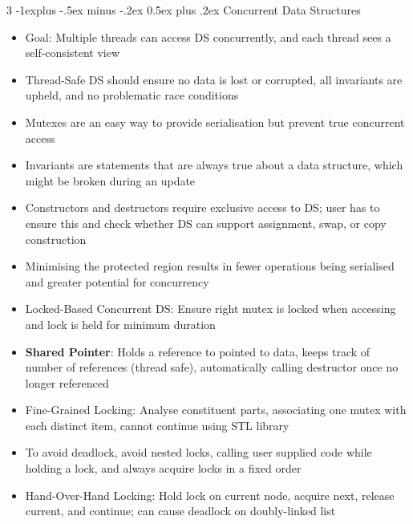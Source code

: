 \documentclass[10pt, landscape]{article}
\makeatletter
\renewcommand{\section}{\@startsection{section}{1}{0mm}%
                                {-1ex plus -.5ex minus -.2ex}%
                                {0.5ex plus .2ex}%
                                {\normalfont\large\bfseries}}
\renewcommand{\section}{\@startsection{section}{2}{0mm}%
                                {-1explus -.5ex minus -.2ex}%
                                {0.5ex plus .2ex}%
                                {\normalfont\normalsize\bfseries}}
\makeatother
\begin{document}
\begin{multicols*}{3}
\section{Concurrent Data Structures}
\begin{itemize}
    \item Goal: Multiple threads can access DS concurrently, and each thread sees a self-consistent view
    \item Thread-Safe DS should ensure no data is lost or corrupted, all invariants are upheld, and no problematic race conditions
    \item Mutexes are an easy way to provide serialisation but prevent true concurrent access
    \item Invariants are statements that are always true about a data structure, which might be broken during an update
    \item Constructors and destructors require exclusive access to DS; user has to ensure this and check whether DS can support assignment, swap, or copy construction
    \item Minimising the protected region results in fewer operations being serialised and greater potential for concurrency
    \item Locked-Based Concurrent DS: Ensure right mutex is locked when accessing and lock is held for minimum duration
    \item \textbf{Shared Pointer}: Holds a reference to pointed to data, keeps track of number of references (thread safe), automatically calling destructor once no longer referenced
    \item Fine-Grained Locking: Analyse constituent parts, associating one mutex with each distinct item, cannot continue using STL library
    \item To avoid deadlock, avoid nested locks, calling user supplied code while holding a lock, and always acquire locks in a fixed order
    \item Hand-Over-Hand Locking: Hold lock on current node, acquire next, release current, and continue; can cause deadlock on doubly-linked list
\end{itemize}


\end{multicols*}
\end{document}

